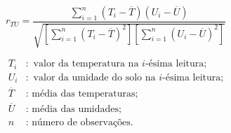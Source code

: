 \documentclass[preview,10pt]{standalone}
\begin{document}
\[
r_{TU} = 
\frac{
\sum_{i=1}^{n} (T_i - \overline{T})(U_i - \overline{U})
}{
\sqrt{
\left[
\sum_{i=1}^{n} (T_i - \overline{T})^2
\right]
\left[
\sum_{i=1}^{n} (U_i - \overline{U})^2
\right]
}
}
\]

\noindent 

\begin{align*}
T_i & : \text{ valor da temperatura na $i$-ésima leitura;}\\
U_i & : \text{ valor da umidade do solo na $i$-ésima leitura;}\\
\overline{T} & : \text{ média das temperaturas;}\\
\overline{U} & : \text{ média das umidades;}\\
n & : \text{ número de observações.}
\end{align*}
\end{document}
